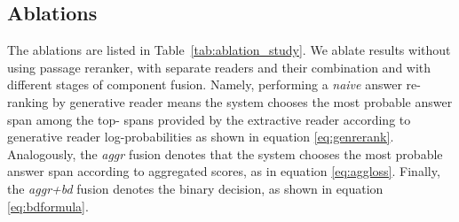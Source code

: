 \documentclass[11pt]{article}
\begin{document}
\subsection{Ablations}

The ablations are listed in Table~\ref{tab:ablation_study}. 
We ablate results without using passage reranker, with separate readers and their combination and with different stages of component fusion. 
Namely, performing a \emph{naive} answer re-ranking by generative reader means the system chooses the most probable answer span among the top- spans provided by the extractive reader according to generative reader log-probabilities as shown in equation \eqref{eq:genrerank}. 
Analogously, the \emph{aggr} fusion denotes that the system chooses the most probable answer span according to aggregated scores, as in equation \eqref{eq:aggloss}. 
Finally, the \emph{aggr+bd} fusion denotes the binary decision, as shown in equation \eqref{eq:bdformula}. 
\end{document}
